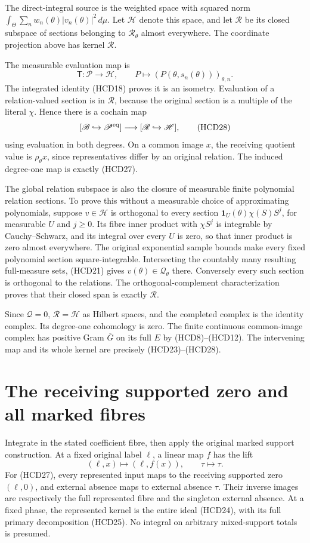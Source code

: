 \documentclass[11pt]{article}
\begin{document}
The direct-integral source is the weighted space with squared
norm $\int_\Theta\sum_n w_n(\theta)|v_n(\theta)|^2\,d\mu$.
Let $\mathscr H$ denote this space, and let $\mathscr R$
be its closed subspace of sections belonging to
$\mathcal R_\theta$ almost everywhere. The coordinate
projection above has kernel $\mathscr R$.

The measurable evaluation map is
\[
 \mathsf T:\mathscr P\longrightarrow\mathscr H,\qquad
 P\longmapsto(P(\theta,s_n(\theta)))_{\theta,n}.
\]
The integrated identity (HCD18) proves it is an isometry.
Evaluation of a relation-valued section is in $\mathscr R$,
because the original section is a multiple of the literal
$\chi$. Hence there is a cochain map
\[
 [\mathscr B\hookrightarrow\mathscr P^{\rm eq}]
 \longrightarrow[\mathscr R\hookrightarrow\mathscr H],
 \tag{HCD28}
\]
using evaluation in both degrees. On a common image $x$,
the receiving quotient value is $\rho_\theta x$, since
representatives differ by an original relation.
The induced degree-one map is exactly (HCD27).

The global relation subspace is also the closure of measurable
finite polynomial relation sections. To prove this without
a measurable choice of approximating polynomials, suppose
$v\in\mathscr H$ is orthogonal to every section
$\mathbf1_U(\theta)\chi(S)S^j$, for measurable $U$ and $j\ge0$.
Its fibre inner product with $\chi S^j$ is integrable by
Cauchy--Schwarz, and its integral over every $U$ is zero,
so that inner product is zero almost everywhere.
The original exponential sample bounds make every fixed
polynomial section square-integrable.
Intersecting the countably many resulting full-measure sets,
(HCD21) gives $v(\theta)\in\mathcal Q_\theta$ there.
Conversely every such section is orthogonal to the relations.
The orthogonal-complement characterization proves that their
closed span is exactly $\mathscr R$.

Since $\mathscr Q=0$, $\mathscr R=\mathscr H$ as Hilbert
spaces, and the completed complex is the identity complex.
Its degree-one cohomology is zero. The finite continuous
common-image complex has positive Gram $\overline G$
on its full $E$ by (HCD8)--(HCD12).
The intervening map and its whole kernel are precisely
(HCD23)--(HCD28).

\section{The receiving supported zero and all marked fibres}

Integrate in the stated coefficient fibre, then apply the
original marked support construction. At a fixed original
label $\ell$, a linear map $f$ has the lift
\[
 (\ell,x)\longmapsto(\ell,f(x)),\qquad
 \tau\longmapsto\tau.
 \tag{HCD29}
\]
For (HCD27), every represented input maps to the receiving
supported zero $(\ell,0)$, and external absence maps to
external absence $\tau$. Their inverse images are respectively
the full represented fibre and the singleton external absence.
At a fixed phase, the represented kernel is the entire
ideal (HCD24), with its full primary decomposition (HCD25).
No integral on arbitrary mixed-support totals is presumed.
\end{document}
